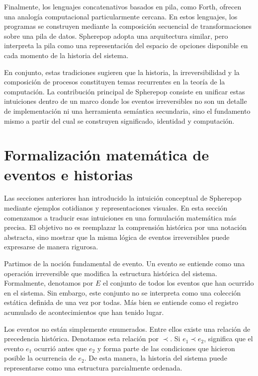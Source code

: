 \documentclass[12pt]{article}
\begin{document}
Finalmente, los lenguajes concatenativos basados en pila, como Forth, ofrecen una analogía computacional particularmente cercana. En estos lenguajes, los programas se construyen mediante la composición secuencial de transformaciones sobre una pila de datos. Spherepop adopta una arquitectura similar, pero interpreta la pila como una representación del espacio de opciones disponible en cada momento de la historia del sistema.

En conjunto, estas tradiciones sugieren que la historia, la irreversibilidad y la composición de procesos constituyen temas recurrentes en la teoría de la computación. La contribución principal de Spherepop consiste en unificar estas intuiciones dentro de un marco donde los eventos irreversibles no son un detalle de implementación ni una herramienta semántica secundaria, sino el fundamento mismo a partir del cual se construyen significado, identidad y computación.

\section{Formalización matemática de eventos e historias}

Las secciones anteriores han introducido la intuición conceptual de Spherepop mediante ejemplos cotidianos y representaciones visuales. En esta sección comenzamos a traducir esas intuiciones en una formulación matemática más precisa. El objetivo no es reemplazar la comprensión histórica por una notación abstracta, sino mostrar que la misma lógica de eventos irreversibles puede expresarse de manera rigurosa.

Partimos de la noción fundamental de evento. Un evento se entiende como una operación irreversible que modifica la estructura histórica del sistema. Formalmente, denotamos por \(E\) el conjunto de todos los eventos que han ocurrido en el sistema. Sin embargo, este conjunto no se interpreta como una colección estática definida de una vez por todas. Más bien se entiende como el registro acumulado de acontecimientos que han tenido lugar.

Los eventos no están simplemente enumerados. Entre ellos existe una relación de precedencia histórica. Denotamos esta relación por \( \prec \). Si \(e_1 \prec e_2\), significa que el evento \(e_1\) ocurrió antes que \(e_2\) y forma parte de las condiciones que hicieron posible la ocurrencia de \(e_2\). De esta manera, la historia del sistema puede representarse como una estructura parcialmente ordenada.
\end{document}
